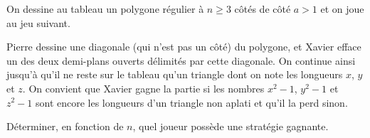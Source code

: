 On dessine au tableau un polygone régulier à $n \geq 3$ côtés de côté $a > 1$ et on joue au jeu suivant.

Pierre dessine une diagonale (qui n'est pas un côté) du polygone, et Xavier efface un des deux demi-plans ouverts délimités par cette diagonale. On continue ainsi jusqu'à qu'il ne reste sur le tableau qu'un triangle dont on note les longueurs $x$, $y$ et $z$. On convient que Xavier gagne la partie si les nombres $x^2 - 1$, $y^2 - 1$ et $z^2 - 1$ sont encore les longueurs d'un triangle non aplati et qu'il la perd sinon.

Déterminer, en fonction de $n$, quel joueur possède une stratégie gagnante.
